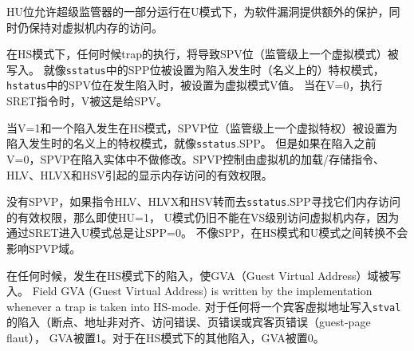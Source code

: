 \begin{commentary}
  HU位允许超级监管器的一部分运行在U模式下，为软件漏洞提供额外的保护，同时仍保持对虚拟机内存的访问。
\end{commentary}

在HS模式下，任何时候trap的执行，将导致SPV位（监管级上一个虚拟模式）被写入。
就像{\tt sstatus}中的SPP位被设置为陷入发生时（名义上的）特权模式，{\tt hstatus}中的SPV位在发生陷入时，被设置为虚拟模式V值。
当在V=0，执行SRET指令时，V被这是给SPV。

当V=1和一个陷入发生在HS模式，SPVP位（监管级上一个虚拟特权）被设置为陷入发生时的名义上的特权模式，就像{\tt sstatus}.SPP。
但是如果在陷入之前V=0，SPVP在陷入实体中不做修改。SPVP控制由虚拟机的加载/存储指令、HLV、HLVX和HSV引起的显示内存访问的有效权限。

\begin{commentary}
  没有SPVP，如果指令HLV、HLVX和HSV转而去{\tt sstatus}.SPP寻找它们内存访问的有效权限，那么即使HU=1，
  U模式仍旧不能在VS级别访问虚拟机内存，因为通过SRET进入U模式总是让SPP=0。
  不像SPP，在HS模式和U模式之间转换不会影响SPVP域。
\end{commentary}

在任何时候，发生在HS模式下的陷入，使GVA（Guest Virtual Address）域被写入。
Field GVA (Guest Virtual Address) is written by the implementation
whenever a trap is taken into HS-mode.
对于任何将一个宾客虚拟地址写入{\tt stval}的陷入（断点、地址非对齐、访问错误、页错误或宾客页错误（guest-page flaut），
GVA被置1。对于在HS模式下的其他陷入，GVA被置0。

